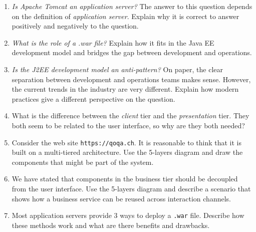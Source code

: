 \begin{enumerate}
\item \emph{Is Apache Tomcat an application server?} The answer to this question depends on the definition of \emph{application server}. Explain why it is correct to answer positively and negatively to the question.
\item \emph{What is the role of a .war file?} Explain how it fits in the Java EE development model and bridges the gap between development and operations.
\item \emph{Is the J2EE development model an anti-pattern?} On paper, the clear separation between development and operations teams makes sense. However, the current trends in the industry are very different. Explain how modern practices give a different perspective on the question.
\item What is the difference between the \emph{client} tier and the \emph{presentation} tier. They both seem to be related to the user interface, so why are they both needed?
\item Consider the web site \texttt{https://qoqa.ch}. It is reasonable to think that it is built on a multi-tiered architecture. Use the 5-layers diagram and draw the components that might be part of the system. 
\item We have stated that components in the business tier should be decoupled from the user interface. Use the 5-layers diagram and describe a scenario that shows how a business service can be reused across interaction channels.
\item Most application servers provide 3 ways to deploy a \texttt{.war} file. Describe how these methods work and what are there benefits and drawbacks.
\end{enumerate}
